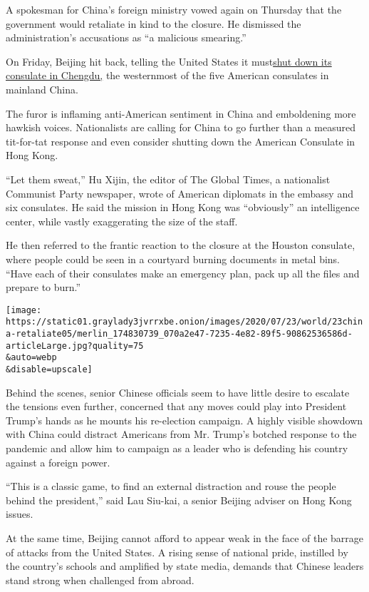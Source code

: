 A spokesman for China's foreign ministry vowed again on Thursday that
the government would retaliate in kind to the closure. He dismissed the
administration's accusations as ``a malicious smearing.''

On Friday, Beijing hit back, telling the United States it
must\href{https://www.nytimes3xbfgragh.onion/2020/07/24/world/asia/china-us-consulate-chengdu.html}{shut
down its consulate in Chengdu,} the westernmost of the five American
consulates in mainland China.

The furor is inflaming anti-American sentiment in China and emboldening
more hawkish voices. Nationalists are calling for China to go further
than a measured tit-for-tat response and even consider shutting down the
American Consulate in Hong Kong.

``Let them sweat,'' Hu Xijin, the editor of The Global Times, a
nationalist Communist Party newspaper, wrote of American diplomats in
the embassy and six consulates. He said the mission in Hong Kong was
``obviously'' an intelligence center, while vastly exaggerating the size
of the staff.

He then referred to the frantic reaction to the closure at the Houston
consulate, where people could be seen in a courtyard burning documents
in metal bins. ``Have each of their consulates make an emergency plan,
pack up all the files and prepare to burn.''

\texttt{[image: https://static01.graylady3jvrrxbe.onion/images/2020/07/23/world/23china-retaliate05/merlin\_174830739\_070a2e47-7235-4e82-89f5-90862536586d-articleLarge.jpg?quality=75\\\&auto=webp\\\&disable=upscale]}

Behind the scenes, senior Chinese officials seem to have little desire
to escalate the tensions even further, concerned that any moves could
play into President Trump's hands as he mounts his re-election campaign.
A highly visible showdown with China could distract Americans from Mr.
Trump's botched response to the pandemic and allow him to campaign as a
leader who is defending his country against a foreign power.

``This is a classic game, to find an external distraction and rouse the
people behind the president,'' said Lau Siu-kai, a senior Beijing
adviser on Hong Kong issues.

At the same time, Beijing cannot afford to appear weak in the face of
the barrage of attacks from the United States. A rising sense of
national pride, instilled by the country's schools and amplified by
state media, demands that Chinese leaders stand strong when challenged
from abroad.

